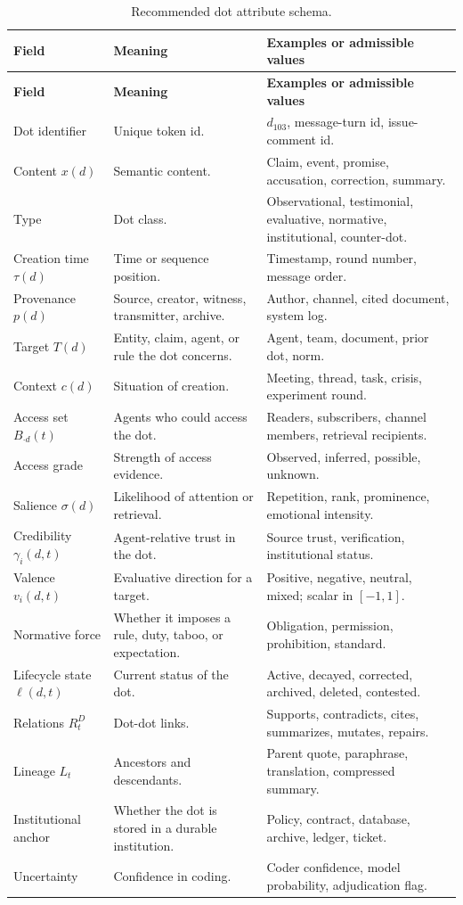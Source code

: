\documentclass[11pt]{article}
\theoremstyle{remark}
\begin{document}
{\small
\begin{longtable}{L{0.22\textwidth}L{0.34\textwidth}L{0.34\textwidth}}
\caption{Recommended dot attribute schema.}\label{tab:dot-attribute-schema}\\
\toprule
\textbf{Field} & \textbf{Meaning} & \textbf{Examples or admissible values}\\
\midrule
\endfirsthead
\toprule
\textbf{Field} & \textbf{Meaning} & \textbf{Examples or admissible values}\\
\midrule
\endhead
\bottomrule
\endlastfoot
Dot identifier & Unique token id. & \(d_{103}\), message-turn id, issue-comment id.\\
Content \(x(d)\) & Semantic content. & Claim, event, promise, accusation, correction, summary.\\
Type & Dot class. & Observational, testimonial, evaluative, normative, institutional, counter-dot.\\
Creation time \(\tau(d)\) & Time or sequence position. & Timestamp, round number, message order.\\
Provenance \(p(d)\) & Source, creator, witness, transmitter, archive. & Author, channel, cited document, system log.\\
Target \(T(d)\) & Entity, claim, agent, or rule the dot concerns. & Agent, team, document, prior dot, norm.\\
Context \(c(d)\) & Situation of creation. & Meeting, thread, task, crisis, experiment round.\\
Access set \(B_{\cdot d}(t)\) & Agents who could access the dot. & Readers, subscribers, channel members, retrieval recipients.\\
Access grade & Strength of access evidence. & Observed, inferred, possible, unknown.\\
Salience \(\sigma(d)\) & Likelihood of attention or retrieval. & Repetition, rank, prominence, emotional intensity.\\
Credibility \(\gamma_i(d,t)\) & Agent-relative trust in the dot. & Source trust, verification, institutional status.\\
Valence \(v_i(d,t)\) & Evaluative direction for a target. & Positive, negative, neutral, mixed; scalar in \([-1,1]\).\\
Normative force & Whether it imposes a rule, duty, taboo, or expectation. & Obligation, permission, prohibition, standard.\\
Lifecycle state \(\ell(d,t)\) & Current status of the dot. & Active, decayed, corrected, archived, deleted, contested.\\
Relations \(R_t^D\) & Dot-dot links. & Supports, contradicts, cites, summarizes, mutates, repairs.\\
Lineage \(L_t\) & Ancestors and descendants. & Parent quote, paraphrase, translation, compressed summary.\\
Institutional anchor & Whether the dot is stored in a durable institution. & Policy, contract, database, archive, ledger, ticket.\\
Uncertainty & Confidence in coding. & Coder confidence, model probability, adjudication flag.\\
\end{longtable}
}
\end{document}
